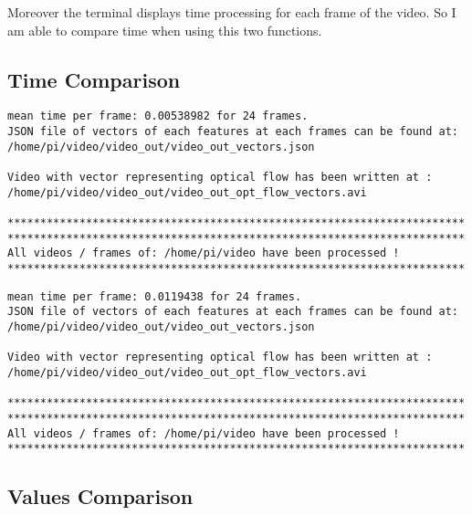 Moreover the terminal displays time processing for each frame of the video. So I am able to compare time when using this two functions.


\subsection{Time Comparison}

\begin{lstlisting}
mean time per frame: 0.00538982 for 24 frames.
JSON file of vectors of each features at each frames can be found at: /home/pi/video/video_out/video_out_vectors.json

Video with vector representing optical flow has been written at : /home/pi/video/video_out/video_out_opt_flow_vectors.avi

**********************************************************************
**********************************************************************
All videos / frames of: /home/pi/video have been processed !
**********************************************************************
\end{lstlisting}


\begin{lstlisting}
mean time per frame: 0.0119438 for 24 frames.
JSON file of vectors of each features at each frames can be found at: /home/pi/video/video_out/video_out_vectors.json

Video with vector representing optical flow has been written at : /home/pi/video/video_out/video_out_opt_flow_vectors.avi

**********************************************************************
**********************************************************************
All videos / frames of: /home/pi/video have been processed !
**********************************************************************
\end{lstlisting}



\subsection{Values Comparison}

